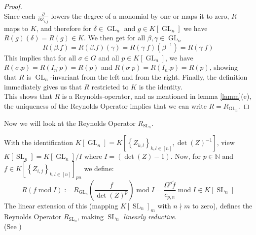 \begin{proof}
\begin{equation}
  \end{equation}
  Since each $ \frac {\partial}{ \partial Z_{i,j} } $ lowers the degree of a monomial by one or maps it to zero, $R$ maps to $K$, and therefore for $ \delta \in \operatorname{GL}_n $ and $ g \in K \left\lbrack \operatorname{GL}_n \right\rbrack $ we have $ R(g)(\delta) = R(g) \in K $.
  We then get for all $ \beta,\gamma \in \operatorname{GL}_n $
  \begin{equation}
    R \left( \beta . f \right)
    = R \left( \beta . f \right) \left( \gamma \right) 
    = R \left( \gamma \dot{\phantom{.}} f \right) \left( \beta^{-1} \right) 
    = R \left( \gamma \dot{\phantom{.}} f \right)
  \end{equation}
  This implies that for all $\sigma \in G$ and all $p \in K[\operatorname{GL}_n]$, we have $R(\sigma.p) = R(I_n\dot{\phantom{.}}p) = R(p)$ and $R(\sigma\dot{\phantom{.}}p) = R(I_n.p)=R(p)$, showing that $R$ is $\operatorname{GL}_n$-invariant from the left and from the right.
  Finally, the definition immediately gives us that $R$ restricted to $K$ is the identity.  \\
  This shows that $R$ is a Reynolds-operator, and as mentioned in lemma \ref{lamm}(e), the uniqueness of the Reynolds Operator implies that we can write $ R = R_{\operatorname{GL}_n} $.
\end{proof}

Now we will look at the Reynolds Operator $R_{\operatorname{SL}_n}$.

\begin{corollary}\label{esel}
  With the identification $ K \left\lbrack \operatorname{GL}_n \right\rbrack = K \left\lbrack \left\{ Z_{k,l} \right\}_{k,l \in [ n ]} , \operatorname{det} (Z) ^{-1} \right\rbrack $, view \linebreak$ K \left\lbrack \operatorname{SL}_n \right\rbrack = K \left\lbrack \operatorname{GL}_n \right\rbrack / I $ where $ I = \left( \operatorname{det} (Z) -1 \right) $.
  Now, for $ p \in \mathbb{N} $ and \linebreak$ f \in K \left\lbrack \left\{ Z_{i,j} \right\}_{k,l \in [ n ]} \right\rbrack_{pn} $ we define:
  \begin{equation}
    R ( f \operatorname{mod} I )
    := R_{\operatorname{GL}_n} \left( \frac{f}{\operatorname{det}(Z)^p} \right) \operatorname{mod} I
    = \frac{\Omega^p \tilde{f}}{c_{p,n}} \operatorname{mod} I \in K[\operatorname{SL}_n]
  \end{equation}
  The linear extension of this (mapping $K \left\lbrack \operatorname{SL}_n \right\rbrack_m$ with $n \nmid m$ to zero), defines the Reynolds Operator $R_{\operatorname{SL}_n}$, making $\operatorname{SL}_n$ \textit{linearly reductive}.  \\
  (See \cite[4.5.28]{DK15})
\end{corollary}

